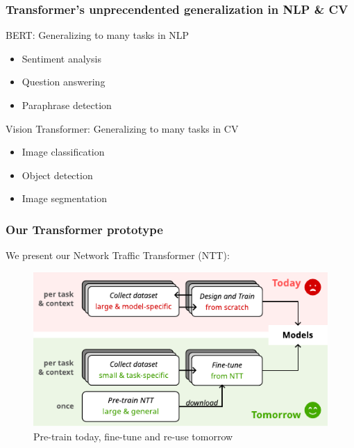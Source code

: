 \documentclass{beamer}
\begin{document}
\begin{frame}
\frametitle{Transformer's unprecendented generalization in NLP \& CV}
\pause

BERT: Generalizing to many tasks in NLP

\begin{itemize}  
    \item<1-> Sentiment analysis
    \item<1-> Question answering
    \item<1-> Paraphrase detection
\end{itemize}
\pause

Vision Transformer: Generalizing to many tasks in CV

\begin{itemize}  
    \item<1-> Image classification
    \item<1-> Object detection
    \item<1-> Image segmentation
\end{itemize}



\end{frame}


\begin{frame}
\frametitle{Our Transformer prototype}

We present our Network Traffic Transformer (NTT):
\pause

\begin{figure}[!hbt]
  \begin{center}
    \includegraphics[scale=1.1]{figures/vision.pdf}
    \caption{Pre-train today, fine-tune and re-use tomorrow}
    \label{fig:vision}
  \end{center}
\end{figure}
    
    
\end{frame}
\end{document}
